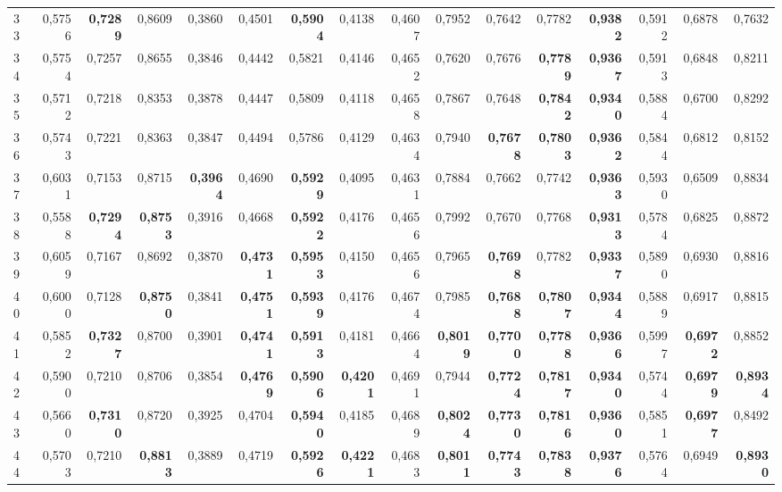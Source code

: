 \begin{table}[htp!]
\begin{adjustwidth}{-2cm}{}
\begin{tabular}{ l | *{15}{| r}}
33	&	0,5756	&	\textbf{0,7289}	&	0,8609	&	0,3860	&	0,4501	&	\textbf{0,5904}	&	0,4138	&	0,4607	&	0,7952	&	0,7642	&	0,7782	&	\textbf{0,9382}	&	0,5912	&	0,6878	&	0,7632	\\
34	&	0,5754	&	0,7257	&	0,8655	&	0,3846	&	0,4442	&	0,5821	&	0,4146	&	0,4652	&	0,7620	&	0,7676	&	\textbf{0,7789}	&	\textbf{0,9367}	&	0,5913	&	0,6848	&	0,8211	\\
35	&	0,5712	&	0,7218	&	0,8353	&	0,3878	&	0,4447	&	0,5809	&	0,4118	&	0,4658	&	0,7867	&	0,7648	&	\textbf{0,7842}	&	\textbf{0,9340}	&	0,5884	&	0,6700	&	0,8292	\\
36	&	0,5743	&	0,7221	&	0,8363	&	0,3847	&	0,4494	&	0,5786	&	0,4129	&	0,4634	&	0,7940	&	\textbf{0,7678}	&	\textbf{0,7803}	&	\textbf{0,9362}	&	0,5844	&	0,6812	&	0,8152	\\
37	&	0,6031	&	0,7153	&	0,8715	&	\textbf{0,3964}	&	0,4690	&	\textbf{0,5929}	&	0,4095	&	0,4631	&	0,7884	&	0,7662	&	0,7742	&	\textbf{0,9363}	&	0,5930	&	0,6509	&	0,8834	\\
38	&	0,5588	&	\textbf{0,7294}	&	\textbf{0,8753}	&	0,3916	&	0,4668	&	\textbf{0,5922}	&	0,4176	&	0,4656	&	0,7992	&	0,7670	&	0,7768	&	\textbf{0,9313}	&	0,5784	&	0,6825	&	0,8872	\\
39	&	0,6059	&	0,7167	&	0,8692	&	0,3870	&	\textbf{0,4731}	&	\textbf{0,5953}	&	0,4150	&	0,4656	&	0,7965	&	\textbf{0,7698}	&	0,7782	&	\textbf{0,9337}	&	0,5890	&	0,6930	&	0,8816	\\
40	&	0,6000	&	0,7128	&	\textbf{0,8750}	&	0,3841	&	\textbf{0,4751}	&	\textbf{0,5939}	&	0,4176	&	0,4674	&	0,7985	&	\textbf{0,7688}	&	\textbf{0,7807}	&	\textbf{0,9344}	&	0,5889	&	0,6917	&	0,8815	\\
41	&	0,5852	&	\textbf{0,7327}	&	0,8700	&	0,3901	&	\textbf{0,4741}	&	\textbf{0,5913}	&	0,4181	&	0,4664	&	\textbf{0,8019}	&	\textbf{0,7700}	&	\textbf{0,7788}	&	\textbf{0,9366}	&	0,5997	&	\textbf{0,6972}	&	0,8852	\\
42	&	0,5900	&	0,7210	&	0,8706	&	0,3854	&	\textbf{0,4769}	&	\textbf{0,5906}	&	\textbf{0,4201}	&	0,4691	&	0,7944	&	\textbf{0,7724}	&	\textbf{0,7817}	&	\textbf{0,9340}	&	0,5744	&	\textbf{0,6979}	&	\textbf{0,8934}	\\
43	&	0,5660	&	\textbf{0,7310}	&	0,8720	&	0,3925	&	0,4704	&	\textbf{0,5940}	&	0,4185	&	0,4689	&	\textbf{0,8024}	&	\textbf{0,7730}	&	\textbf{0,7816}	&	\textbf{0,9360}	&	0,5851	&	\textbf{0,6977}	&	0,8492	\\
44	&	0,5703	&	0,7210	&	\textbf{0,8813}	&	0,3889	&	0,4719	&	\textbf{0,5926}	&	\textbf{0,4221}	&	0,4683	&	\textbf{0,8011}	&	\textbf{0,7743}	&	\textbf{0,7838}	&	\textbf{0,9376}	&	0,5764	&	0,6949	&	\textbf{0,8930}	\\

\end{tabular}
\end{adjustwidth}
\end{table}

